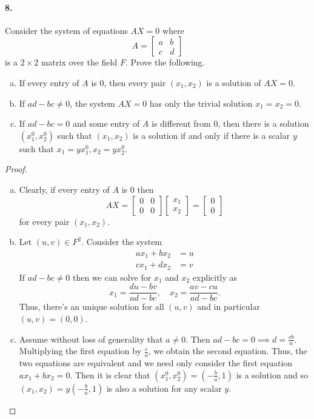 \documentclass{article}
\begin{document}
\paragraph{8.} Consider the system of equations $AX = 0$ where \[
  A = \begin{bmatrix}
    a & b \\
    c & d
  \end{bmatrix}
\] is a $2 \times 2$ matrix over the field $F$. Prove the following.
\begin{enumerate}[(a)]
  \item If every entry of $A$ is 0, then every pair $(x_1, x_2)$ is a solution
    of $AX = 0$.
  \item If $ad - bc \neq 0$, the system $AX = 0$ has only the trivial solution
    $x_1 = x_2 = 0$.
  \item If $ad - bc = 0$ and some entry of $A$ is different from 0, then there
    is a solution $(x_1^0, x_2^0)$ such that $(x_1, x_2)$ is a solution if and
    only if there is a scalar $y$ such that $x_1 = yx_1^0, x_2 = yx_2^0$.
\end{enumerate}

\begin{proof}
  \begin{enumerate}[(a)]
    \item Clearly, if every entry of $A$ is 0 then \[
        AX = \begin{bmatrix}
          0 & 0 \\
          0 & 0
        \end{bmatrix}
        \begin{bmatrix}
          x_1 \\
          x_2
        \end{bmatrix}
        =
        \begin{bmatrix}
          0 \\
          0
        \end{bmatrix}
      \] for every pair $(x_1, x_2)$.
    \item Let $(u, v) \in F^2$. Consider the system
      \begin{align*}
        ax_1 + bx_2 &= u \\
        cx_1 + dx_2 &= v
      \end{align*}
      If $ad - bc \neq 0$ then we can solve for $x_1$ and $x_2$ explicitly as \[
        x_1 = \frac{du - bv}{ad - bc}, \quad
        x_2 = \frac{av - cu}{ad - bc}.
      \] Thus, there's an unique solution for all $(u, v)$ and in particular
      $(u, v) = (0, 0)$.
    \item Assume without loss of generality that $a \neq 0$. Then $ad - bc = 0
      \implies d = \frac{cb}{a}$. Multiplying the first equation by
      $\frac{c}{a}$, we obtain the second equation. Thus, the two equations are
      equivalent and we need only consider the first equation $ax_1 + bx_2 = 0$.
      Then it is clear that $(x_1^0, x_2^0) = (-\frac{b}{a}, 1)$ is a solution
      and so $(x_1, x_2) = y(-\frac{b}{a}, 1)$ is also a solution for any scalar
      $y$.
  \end{enumerate}
\end{proof}
\end{document}
